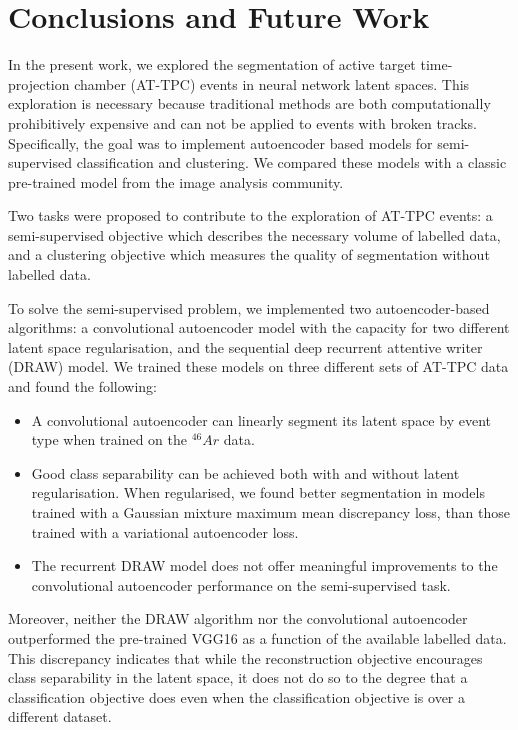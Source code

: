 \chapter{Conclusions and Future Work}


In the present work, we explored the segmentation of active target time-projection chamber (AT-TPC) events in neural network latent spaces. This exploration is necessary because traditional methods are both computationally prohibitively expensive and can not be applied to events with broken tracks. Specifically, the goal was to implement autoencoder based models for semi-supervised classification and clustering. We compared these models with a classic pre-trained model from the image analysis community.

Two tasks were proposed to contribute to the exploration of  AT-TPC events: a semi-supervised objective which describes the necessary volume of labelled data, and a clustering objective which measures the quality of segmentation without labelled data. 

To solve the semi-supervised problem, we implemented two autoencoder-based algorithms: a convolutional autoencoder model with the capacity for two different latent space regularisation, and the sequential deep recurrent attentive writer (DRAW) model. We trained these models on three different sets of AT-TPC data and found the following:

\begin{itemize}
\item A convolutional autoencoder can linearly segment its latent space by event type when trained on the ${}^{46}Ar$ data.
\item Good class separability can be achieved both with and without latent regularisation.  When regularised, we found better segmentation in models trained with a Gaussian mixture maximum mean discrepancy loss, than those trained with a variational autoencoder loss. 
\item The recurrent DRAW  model does not offer meaningful improvements to the convolutional autoencoder performance on the semi-supervised task. 
\end{itemize}

Moreover, neither the DRAW algorithm nor the convolutional autoencoder outperformed the pre-trained VGG16 as a function of the available labelled data. This discrepancy indicates that while the reconstruction objective encourages class separability in the latent space, it does not do so to the degree that a classification objective does even when the classification objective is over a different dataset. 

